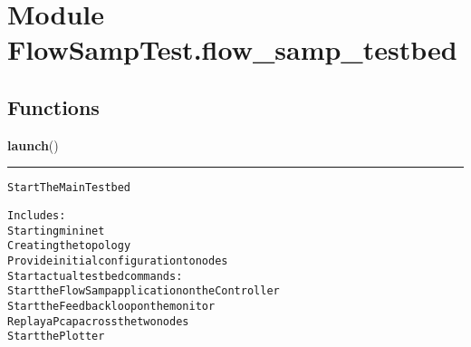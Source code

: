 %
%
%


\section{Module FlowSampTest.flow\_samp\_testbed}

    \label{FlowSampTest:flow_samp_testbed}


  \subsection{Functions}

    \label{FlowSampTest:flow_samp_testbed:launch}

    \vspace{0.5ex}

\hspace{.8\funcindent}\begin{boxedminipage}{\funcwidth}

    \raggedright \textbf{launch}()

    \vspace{-1.5ex}

    \rule{\textwidth}{0.5\fboxrule}
\setlength{\parskip}{2ex}
\begin{alltt}
Start The Main Testbed

Includes:
Starting mininet
Creating the topology
Provide initial configuration to nodes
Start actual testbed commands:
    Start the FlowSamp application on the Controller
    Start the Feedback loop on the monitor
    Replay a Pcap across the two nodes
    Start the Plotter
\end{alltt}

\setlength{\parskip}{1ex}
    \end{boxedminipage}

